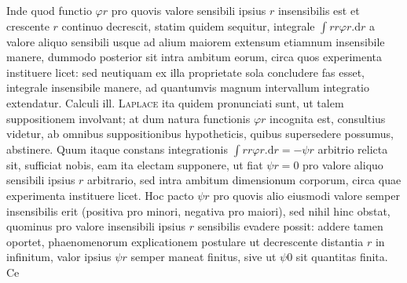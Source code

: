 Inde quod functio $\varphi r$ pro quovis valore sensibili ipsius $r$ insensibilis est et crescente $r$ continuo decrescit, statim quidem sequitur, integrale $\int rr\varphi r.\mathrm{d}r$ a valore aliquo sensibili usque ad alium maiorem extensum etiamnum insensibile manere, dummodo posterior sit intra ambitum eorum, circa quos experimenta instituere licet: sed neutiquam ex illa proprietate sola concludere fas esset, integrale insensibile manere, ad quantumvis magnum intervallum integratio extendatur. Calculi ill. \textsc{Laplace} ita quidem pronunciati sunt, ut talem suppositionem involvant; at dum natura functionis $\varphi r$ incognita est, consultius videtur, ab omnibus suppositionibus hypotheticis, quibus supersedere possumus, abstinere. Quum itaque constans integrationis $\int rr\varphi r.\mathrm{d}r=-\psi r$ arbitrio relicta sit, sufficiat nobis, eam ita electam supponere, ut fiat $\psi r=0$ pro valore aliquo sensibili ipsius $r$ arbitrario, sed intra ambitum dimensionum corporum, circa quae experimenta instituere licet. Hoc pacto $\psi r$ pro quovis alio eiusmodi valore semper insensibilis erit (positiva pro minori, negativa pro maiori), sed nihil hinc obstat, quominus pro valore insensibili ipsius $r$ sensibilis evadere possit: addere tamen oportet, phaenomenorum explicationem postulare ut decrescente distantia $r$ in infinitum, valor ipsius $\psi r$ semper maneat finitus, sive ut $\psi0$ sit quantitas finita. Ce%
